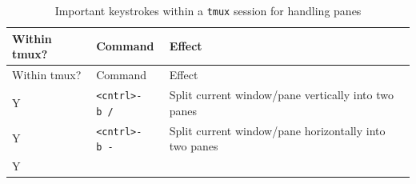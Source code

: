 \documentclass[]{krantz}
\begin{document}
\begin{longtable}[]{@{}lll@{}}
\caption{\label{tab:tmux-pane-strokes} Important keystrokes within a \texttt{tmux} session for handling panes}\tabularnewline
\toprule
\begin{minipage}[b]{0.19\columnwidth}\raggedright
Within tmux?\strut
\end{minipage} & \begin{minipage}[b]{0.25\columnwidth}\raggedright
Command\strut
\end{minipage} & \begin{minipage}[b]{0.42\columnwidth}\raggedright
Effect\strut
\end{minipage}\tabularnewline
\midrule
\endfirsthead
\toprule
\begin{minipage}[b]{0.19\columnwidth}\raggedright
Within tmux?\strut
\end{minipage} & \begin{minipage}[b]{0.25\columnwidth}\raggedright
Command\strut
\end{minipage} & \begin{minipage}[b]{0.42\columnwidth}\raggedright
Effect\strut
\end{minipage}\tabularnewline
\midrule
\endhead
\begin{minipage}[t]{0.19\columnwidth}\raggedright
Y\strut
\end{minipage} & \begin{minipage}[t]{0.25\columnwidth}\raggedright
\texttt{\textless{}cntrl\textgreater{}-b\ /}\strut
\end{minipage} & \begin{minipage}[t]{0.42\columnwidth}\raggedright
Split current window/pane
vertically into two panes\strut
\end{minipage}\tabularnewline
\begin{minipage}[t]{0.19\columnwidth}\raggedright
Y\strut
\end{minipage} & \begin{minipage}[t]{0.25\columnwidth}\raggedright
\texttt{\textless{}cntrl\textgreater{}-b\ -}\strut
\end{minipage} & \begin{minipage}[t]{0.42\columnwidth}\raggedright
Split current window/pane
horizontally into two panes\strut
\end{minipage}\tabularnewline
\begin{minipage}[t]{0.19\columnwidth}\raggedright
Y\strut
\end{minipage} & \begin{minipage}[t]{0.25\columnwidth}\raggedright

\end{minipage}
\end{longtable}
\end{document}
